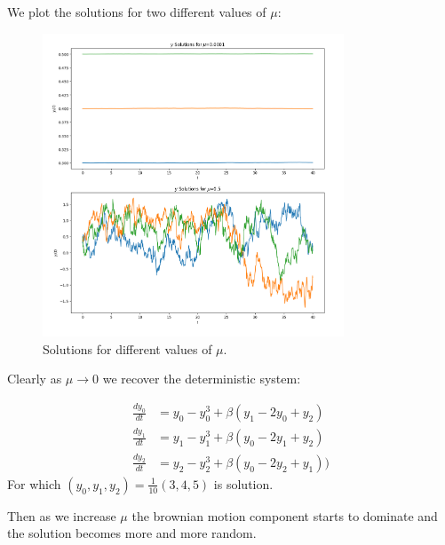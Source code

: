 \documentclass[a4paper, oneside]{book}
\begin{document}
We plot the solutions for two different values of $\mu$:

\begin{figure}[htpb]
    \centering
    \includegraphics[width=0.8\textwidth]{./images/mu.png}
    \caption{Solutions for different values of $\mu$.}
\end{figure}

Clearly as $\mu \to 0$ we recover the deterministic system:

\begin{align}
\frac{dy_{0}}{dt} &= y_{0} - y_{0}^{3} + \beta(y_{1} - 2 y_{0} + y_{2})\\
\frac{dy_{1}}{dt} &= y_{1} - y_{1}^{3} + \beta(y_{0} - 2 y_{1} + y_{2})\\
\frac{dy_{2}}{dt} &= y_{2} - y_{2}^{3} + \beta(y_{0} - 2 y_{2} + y_{1}))
\end{align}
For which $(y_{0}, y_{1}, y_{2}) = \frac{1}{10}(3, 4, 5)$ is solution.

Then as we increase $\mu$ the brownian motion component starts to dominate
and the solution becomes more and more random.



\end{document}
